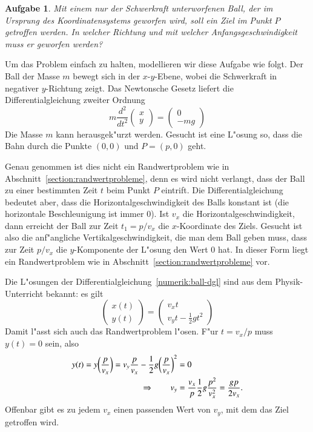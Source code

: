 \newtheorem{aufgabe}{Aufgabe}[chapter]
\begin{aufgabe}
\label{numerik:aufgabe-ball}
Mit einem nur der Schwerkraft unterworfenen Ball, der im Ursprung des
Koordinatensystems geworfen wird, soll ein Ziel im Punkt $P$ getroffen
werden.
In welcher Richtung und mit welcher Anfangsgeschwindigkeit muss er geworfen
werden?
\end{aufgabe}

Um das Problem einfach zu halten, modellieren wir diese Aufgabe wie
folgt.
Der Ball der Masse $m$ bewegt sich in der $x$-$y$-Ebene, wobei die
Schwerkraft in negativer $y$-Richtung zeigt.
Das Newtonsche Gesetz liefert die Differentialgleichung zweiter Ordnung
\begin{equation}
m\frac{d^2}{dt^2}\begin{pmatrix}x\\y\end{pmatrix}
=
\begin{pmatrix}
0\\-mg
\end{pmatrix}
\label{numerik:ball-dgl}
\end{equation}
Die Masse $m$ kann herausgek"urzt werden.
Gesucht ist eine L"osung so, dass die Bahn durch die Punkte $(0,0)$
und $P=(p,0)$ geht.

Genau genommen ist dies nicht ein Randwertproblem wie in 
Abschnitt~\ref{section:randwertprobleme}, denn es wird nicht verlangt,
dass der Ball zu einer bestimmten Zeit $t$ beim Punkt $P$ eintrift.
Die Differentialgleichung bedeutet aber, dass die Horizontalgeschwindigkeit
des Balls konstant ist (die horizontale Beschleunigung ist immer $0$).
Ist $v_x$ die Horizontalgeschwindigkeit, dann erreicht der Ball zur
Zeit $t_1=p/v_x$ die $x$-Koordinate des Ziels.
Gesucht ist also die anf"angliche Vertikalgeschwindigkeit, die man
dem Ball geben muss, dass zur Zeit $p/v_x$ die $y$-Komponente
der L"osung den Wert $0$ hat.
In dieser Form liegt ein Randwertproblem wie in
Abschnitt~\ref{section:randwertprobleme} vor.

Die L"osungen der Differentialgleichung~\ref{numerik:ball-dgl} sind aus
dem Physik-Unterricht bekannt:
es gilt
\begin{equation}
\begin{pmatrix}x(t)\\y(t)\end{pmatrix}
=
\begin{pmatrix}v_xt\\ v_yt-\frac12gt^2\end{pmatrix}
\end{equation}
Damit l"asst sich auch das Randwertproblem l"osen.
F"ur $t=v_x/p$ muss $y(t)=0$ sein, also
\begin{align}
y(t)=y\biggl(\frac{p}{v_x}\biggr)
=v_y\frac{p}{v_x}-\frac12g\biggl(\frac{p}{v_x}\biggr)^2&=0
\notag
\\
\Rightarrow\qquad
v_y
&=
\frac{v_x}p\frac12g\frac{p^2}{v_x^2}=\frac{gp}{2v_x}.
\label{numerik:ball-bedingung}
\end{align}
Offenbar gibt es zu jedem $v_x$ einen passenden Wert von $v_y$,
mit dem das Ziel getroffen wird.

